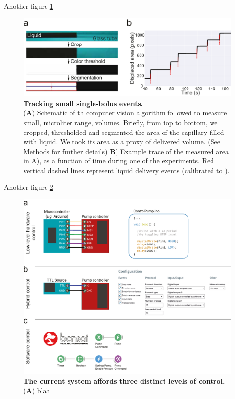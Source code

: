 Another figure \ref{fig:PumpProtocol}
\begin{figure} 
	\centering
	\includegraphics[width=1.0\linewidth]{Figures/Artboard 1_1.pdf}
	\caption{\textbf{Tracking small single-bolus events.}\\
		 (\textbf{A}) Schematic of th computer vision algorithm followed to measure small, microliter range, volumes. Briefly, from top to bottom, we cropped, thresholded and segmented the area of the capillary filled with liquid. We took its area  as a proxy of delivered volume. (See Methods for further details)  \textbf{B}) Example trace of the measured area in A), as a function of time during one of the experiments. Red vertical dashed lines represent liquid delivery events (calibrated to ).}
	\label{fig:PumpProtocol} 
\end{figure}

Another figure \ref{fig:PumpControl}
\begin{figure}
	\centering
	\includegraphics[width=1.0\linewidth]{Figures/Artboard 4.pdf}
	\caption{\textbf{The current system affords three distinct levels of control.}\\
		(\textbf{A}) blah }

	\label{fig:PumpControl} 
\end{figure}



